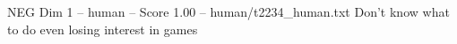 \begin{textsample}{NEG Dim 1 – human – Score 1.00 – human/t2234\_human.txt}  \label{ex:f1_neg_019}
Don't know what to do even losing interest in games

\end{textsample}
